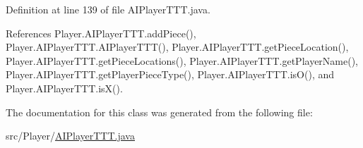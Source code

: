 Definition at line 139 of file A\+I\+Player\+T\+T\+T.\+java.



References Player.\+A\+I\+Player\+T\+T\+T.\+add\+Piece(), Player.\+A\+I\+Player\+T\+T\+T.\+A\+I\+Player\+T\+T\+T(), Player.\+A\+I\+Player\+T\+T\+T.\+get\+Piece\+Location(), Player.\+A\+I\+Player\+T\+T\+T.\+get\+Piece\+Locations(), Player.\+A\+I\+Player\+T\+T\+T.\+get\+Player\+Name(), Player.\+A\+I\+Player\+T\+T\+T.\+get\+Player\+Piece\+Type(), Player.\+A\+I\+Player\+T\+T\+T.\+is\+O(), and Player.\+A\+I\+Player\+T\+T\+T.\+is\+X().



The documentation for this class was generated from the following file\+:\begin{DoxyCompactItemize}
\item 
src/\+Player/\hyperlink{_a_i_player_t_t_t_8java}{A\+I\+Player\+T\+T\+T.\+java}\end{DoxyCompactItemize}
